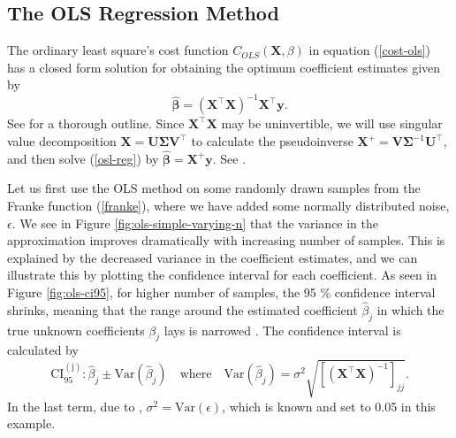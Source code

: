 \documentclass[]{article}
\begin{document}
\subsection{The OLS Regression Method}
The ordinary least square's cost function $C_{OLS}(\mathbf{X},\mathbb{\beta})$ in equation (\ref{cost-ols}) has a closed form solution for obtaining the optimum coefficient estimates given by
\begin{equation}
\label{osl-reg}
	\mathbf{\hat{\beta}} = (\mathbf{X}^\intercal \mathbf{X})^{-1} \mathbf{X}^\intercal \mathbf{y}.
\end{equation}
See \cite{van2015lecture} for a thorough outline. Since $\mathbf{X}^\intercal \mathbf{X}$ may be uninvertible, we will use singular value decomposition $\mathbf{X} = \mathbf{U \Sigma V}^\intercal$ to calculate the pseudoinverse $\mathbf{X}^+ = \mathbf{V \Sigma}^{-1} \mathbf{U}^\intercal$, and then solve (\ref{osl-reg}) by $\mathbf{\hat{\beta}} = \mathbf{X}^+ \mathbf{y}$. See \cite{lay2016linear}.

Let us first use the OLS method on some randomly drawn samples from the Franke function (\ref{franke}), where we have added some normally distributed noise, $\epsilon$. We see in Figure \ref{fig:ols-simple-varying-n} that the variance in the approximation improves dramatically with increasing number of samples. This is explained by the decreased variance in the coefficient estimates, and we can illustrate this by plotting the confidence interval for each coefficient. As seen in Figure \ref{fig:ols-ci95}, for higher number of samples, the 95 \% confidence interval shrinks, meaning that the range around the estimated coefficient $\hat\beta_j$ in which the true unknown coefficients $\beta_j$ lays is narrowed \cite{james2013introduction}. The confidence interval is calculated by
\begin{equation}
\label{ci}
	\mathrm{CI_{95}^{(j)}}: \hat{\beta}_j \pm \mathrm{Var}(\hat{\beta}_j) \quad \text{where} \quad \mathrm{Var}(\hat{\beta}_j) = \sigma^2\sqrt{[(\mathbf{X}^\intercal \mathbf{X})^{-1}]_{jj}}.
\end{equation}
In the last term, due to \cite{fys-stk4155-notes}, $\sigma^2 = \mathrm{Var}(\epsilon)$, which is known and set to 0.05 in this example.
\end{document}
